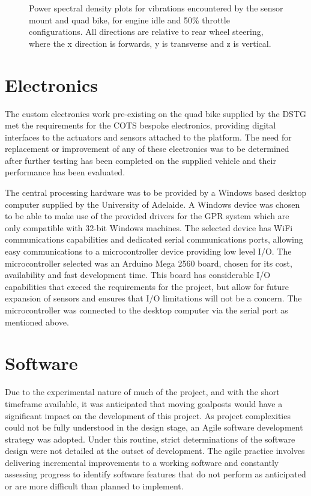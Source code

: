 \documentclass[main.tex]{subfiles}
\begin{document}
\begin{figure}[ht]
{\begin{tabular}{cc}
\end{tabular}}
\caption[Power spectral density plots for vibrations]{Power spectral density plots for vibrations encountered by the sensor mount and quad bike, for engine idle and 50\% throttle configurations. All directions are relative to rear wheel steering, where the x direction is forwards, y is transverse and z is vertical.}
\end{figure}

\section{Electronics}
The custom electronics work pre-existing on the quad bike supplied by the DSTG met the requirements for the COTS bespoke electronics, providing digital interfaces to the actuators and sensors attached to the platform. The need for replacement or improvement of any of these electronics was to be determined after further testing has been completed on the supplied vehicle and their performance has been evaluated.


%
The central processing hardware was to be provided by a Windows based desktop computer supplied by the University of Adelaide. A Windows device was chosen to be able to make use of the provided drivers for the GPR system which are only compatible with 32-bit Windows machines. The selected device has WiFi communications capabilities and dedicated serial communications ports, allowing easy communications to a microcontroller device providing low level I/O.
%
The microcontroller selected was an Arduino Mega 2560 board, chosen for its cost, availability and fast development time. This board has considerable I/O capabilities that exceed the requirements for the project, but allow for future expansion of sensors and ensures that I/O limitations will not be a concern. The microcontroller was connected to the desktop computer via the serial port as mentioned above.

\section{Software}
Due to the experimental nature of much of the project, and with the short timeframe available, it was anticipated that moving goalposts would have a significant impact on the development of this project. As project complexities could not be fully understood in the design stage, an Agile software development strategy was adopted. Under this routine, strict determinations of the software design were not detailed at the outset of development. The agile practice involves delivering incremental improvements to a working software and constantly assessing progress to identify software features that do not perform as anticipated or are more difficult than planned to implement.
\end{document}
